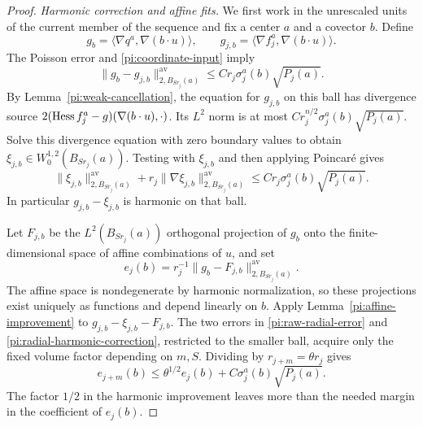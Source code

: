 \begin{proof}
\emph{Harmonic correction and affine fits.}
We first work in the unrescaled units of the current member of the
sequence and fix a center $a$ and a covector $b$.  Define
\[
 g_b=\langle\nabla q^a,\nabla(b\cdot u)\rangle,
 \qquad
 g_{j,b}=\langle\nabla f_j^a,\nabla(b\cdot u)\rangle.
\]
The Poisson error and \eqref{pi:coordinate-input} imply
\begin{equation}
 \|g_b-g_{j,b}\|_{2,B_{Sr_j}(a)}^{\mathrm{av}}
 \le Cr_j\sigma_j^a(b)\sqrt{P_j(a)}.
 \label{pi:raw-radial-error}
\end{equation}
By Lemma~\ref{pi:weak-cancellation}, the equation for $g_{j,b}$
on this ball has divergence source
$2(\operatorname{Hess} f_j^a-g)(\nabla(b\cdot u),\cdot)$.
Its $L^2$ norm is at most
$Cr_j^{n/2}\sigma_j^a(b)\sqrt{P_j(a)}$.
Solve this divergence equation with zero boundary values to obtain
$\xi_{j,b}\in W^{1,2}_0(B_{Sr_j}(a))$.  Testing with
$\xi_{j,b}$ and then applying Poincar\'e gives
\begin{equation}
 \|\xi_{j,b}\|_{2,B_{Sr_j}(a)}^{\mathrm{av}}
 +r_j\|\nabla\xi_{j,b}\|_{2,B_{Sr_j}(a)}^{\mathrm{av}}
 \le Cr_j\sigma_j^a(b)\sqrt{P_j(a)}.
 \label{pi:radial-harmonic-correction}
\end{equation}
In particular $g_{j,b}-\xi_{j,b}$ is harmonic on that ball.

Let $F_{j,b}$ be the $L^2(B_{Sr_j}(a))$ orthogonal projection
of $g_b$ onto the finite-dimensional space of affine combinations
of $u$, and set
\[
 e_j(b)=r_j^{-1}
       \|g_b-F_{j,b}\|_{2,B_{Sr_j}(a)}^{\mathrm{av}}.
\]
The affine space is nondegenerate by harmonic normalization, so
these projections exist uniquely as functions and depend linearly
on $b$.  Apply Lemma~\ref{pi:affine-improvement} to
$g_{j,b}-\xi_{j,b}-F_{j,b}$.  The two errors in
\eqref{pi:raw-radial-error} and
\eqref{pi:radial-harmonic-correction}, restricted to the smaller
ball, acquire only the fixed volume factor depending on $m,S$.
Dividing by $r_{j+m}=\theta r_j$ gives
\begin{equation}
 e_{j+m}(b)\le\theta^{1/2}e_j(b)
                  +C\sigma_j^a(b)\sqrt{P_j(a)}.
 \label{pi:fit-recurrence}
\end{equation}
The factor $1/2$ in the harmonic improvement leaves more than the
needed margin in the coefficient of $e_j(b)$.


\end{proof}
